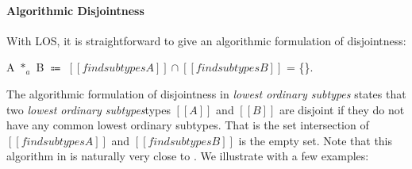 \paragraph{Algorithmic Disjointness}
With LOS, it is straightforward to give an algorithmic formulation of
disjointness:

\begin{definition}
\label{def:inter:ad}
  A $*_a$ B $\Coloneqq$  $ [[findsubtypes A]] \cap [[findsubtypes B]] $ = \{\}.
\end{definition}

\noindent The algorithmic formulation of disjointness in
\emph{lowest ordinary subtypes} states that two
\emph{lowest ordinary subtypes}types
$[[A]]$ and $[[B]]$ are disjoint
if they do not have any common lowest ordinary subtypes. That is the
set intersection of $[[findsubtypes A]]$ and $[[findsubtypes B]]$ is the empty set.
Note that this algorithm in  is naturally very close to .
We illustrate  with a few examples:

